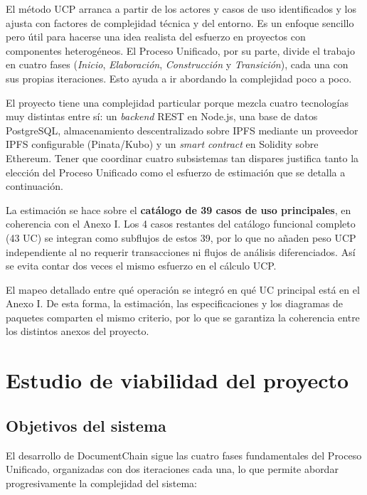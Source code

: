 \documentclass[11pt, a4paper]{article}
\begin{document}
El método UCP arranca a partir de los actores y casos de uso identificados y los ajusta con factores de complejidad técnica y del entorno. Es un enfoque sencillo pero útil para hacerse una idea realista del esfuerzo en proyectos con componentes heterogéneos. El Proceso Unificado, por su parte, divide el trabajo en cuatro fases (\textit{Inicio}, \textit{Elaboración}, \textit{Construcción} y \textit{Transición}), cada una con sus propias iteraciones. Esto ayuda a ir abordando la complejidad poco a poco.

El proyecto tiene una complejidad particular porque mezcla cuatro tecnologías muy distintas entre sí: un \textit{backend} REST en Node.js, una base de datos PostgreSQL, almacenamiento descentralizado sobre IPFS mediante un proveedor IPFS configurable (Pinata/Kubo) y un \textit{smart contract} en Solidity sobre Ethereum. Tener que coordinar cuatro subsistemas tan dispares justifica tanto la elección del Proceso Unificado como el esfuerzo de estimación que se detalla a continuación.

La estimación se hace sobre el \textbf{catálogo de 39 casos de uso principales}, en coherencia con el Anexo I. Los 4 casos restantes del catálogo funcional completo (43 UC) se integran como subflujos de estos 39, por lo que no añaden peso UCP independiente al no requerir transacciones ni flujos de análisis diferenciados. Así se evita contar dos veces el mismo esfuerzo en el cálculo UCP.

El mapeo detallado entre qué operación se integró en qué UC principal está en el Anexo I. De esta forma, la estimación, las especificaciones y los diagramas de paquetes comparten el mismo criterio, por lo que se garantiza la coherencia entre los distintos anexos del proyecto.

\section{Estudio de viabilidad del proyecto}

\subsection{Objetivos del sistema}

El desarrollo de DocumentChain sigue las cuatro fases fundamentales del Proceso Unificado, organizadas con dos iteraciones cada una, lo que permite abordar progresivamente la complejidad del sistema:
\end{document}
